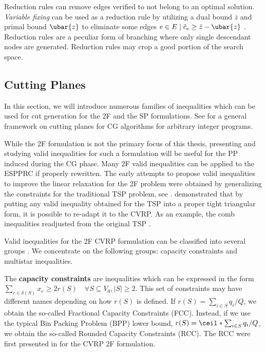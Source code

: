 \medskip

Reduction rules can remove edges verified to not belong to an optimal solution.
\textit{Variable fixing} can be used as a reduction rule
by utilizing a dual bound $\bar{z}$ and primal bound $\ubar{z}$
to eliminate some edges $e \in E \mid \hat{c}_e \ge \bar{z} - \ubar{z}$ \parencite{hadjar2006, irnich2010}.
Reduction rules are a peculiar form of branching where only single descendant nodes are generated.
Reduction rules may crop a good portion of the search space.

\subsection{Cutting Planes}
\label{sec:bap-cutting-planes}

In this section, we will introduce numerous families of inequalities
which can be used for cut generation
for the 2F
and the SP
formulations.
See \textcite{desaulniers2011} for a general framework
on cutting planes for CG algorithms for arbitrary integer programs.

While the 2F formulation is not the primary focus of this thesis,
presenting and studying valid inequalities for such a formulation
will be useful for the PP induced during the CG phase.
Many 2F valid inequalities can be applied to the ESPPRC if properly rewritten.
The early attempts to propose valid inequalities to improve the linear relaxation
for the 2F problem were obtained by generalizing the constraints
for the traditional TSP problem, see \textcite{naddef1993}.
\citeauthor{naddef1993} demonstrated that by putting any valid inequality obtained for the TSP
into a proper tight triangular form, it is possible to re-adapt it to the CVRP.
As an example, the comb inequalities readjusted from the original TSP
\parencite{chvatal1973,grotschel1979,augerat1995approche}.

Valid inequalities for the 2F CVRP formulation can be classified into several groups \parencite{toth2014}.
We concentrate on the following groups: capacity constraints and multistar inequalities.

The \textbf{capacity constraints} are inequalities which can be expressed in the form
$\sum_{e \in \delta(S)} x_e \ge 2 r(S) \quad \forall S \subseteq V_0, |S| \ge 2$.
This set of constraints may have different names depending on how $r(S)$ is defined.
If $r(S) = \sum_{i \in S} q_i / Q$, we obtain the so-called Fractional Capacity Constraints (FCC).
Instead, if we use the typical Bin Packing Problem (BPP) lower bound, $r(S) = \ceil*{\sum_{i \in S} q_i / Q}$, we obtain the so-called Rounded Capacity Constraints (RCC).
The RCC were first presented in \textcite{laporte1983} for the CVRP 2F formulation.

